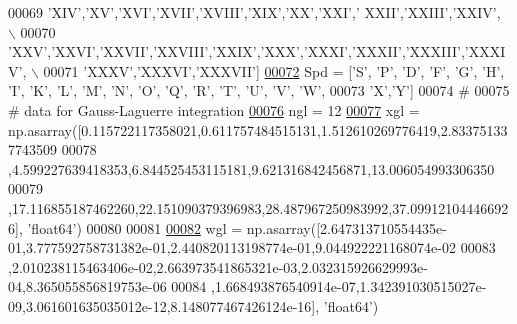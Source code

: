 \begin{DoxyCode}
00069     \textcolor{stringliteral}{'XIV'},\textcolor{stringliteral}{'XV'},\textcolor{stringliteral}{'XVI'},\textcolor{stringliteral}{'XVII'},\textcolor{stringliteral}{'XVIII'},\textcolor{stringliteral}{'XIX'},\textcolor{stringliteral}{'XX'},\textcolor{stringliteral}{'XXI'},\textcolor{stringliteral}{' XXII'},\textcolor{stringliteral}{'XXIII'},\textcolor{stringliteral}{'XXIV'}, \(\backslash\)
00070     \textcolor{stringliteral}{'XXV'},\textcolor{stringliteral}{'XXVI'},\textcolor{stringliteral}{'XXVII'},\textcolor{stringliteral}{'XXVIII'},\textcolor{stringliteral}{'XXIX'},\textcolor{stringliteral}{'XXX'},\textcolor{stringliteral}{'XXXI'},\textcolor{stringliteral}{'XXXII'},\textcolor{stringliteral}{'XXXIII'},\textcolor{stringliteral}{'XXXIV'}, \(\backslash\)
00071     \textcolor{stringliteral}{'XXXV'},\textcolor{stringliteral}{'XXXVI'},\textcolor{stringliteral}{'XXXVII'}]
\hypertarget{__chianti__constants_8py_source_l00072}{}\hyperlink{namespacepyneb_1_1utils_1_1__chianti__constants_a747bb75e4249625a2aefd7060478096f}{00072} Spd = [\textcolor{stringliteral}{'S'}, \textcolor{stringliteral}{'P'}, \textcolor{stringliteral}{'D'}, \textcolor{stringliteral}{'F'}, \textcolor{stringliteral}{'G'}, \textcolor{stringliteral}{'H'}, \textcolor{stringliteral}{'I'}, \textcolor{stringliteral}{'K'}, \textcolor{stringliteral}{'L'}, \textcolor{stringliteral}{'M'}, \textcolor{stringliteral}{'N'}, \textcolor{stringliteral}{'O'}, \textcolor{stringliteral}{'Q'}, \textcolor{stringliteral}{'}\textcolor{stringliteral}{R', '}T', '\textcolor{stringliteral}{U', '}V', 'W',
00073        \textcolor{stringliteral}{'X'},\textcolor{stringliteral}{'Y'}]
00074 \textcolor{comment}{#}
00075 \textcolor{comment}{#  data for Gauss-Laguerre integration}
\hypertarget{__chianti__constants_8py_source_l00076}{}\hyperlink{namespacepyneb_1_1utils_1_1__chianti__constants_aa56aafac98ada2bbf340753caef7378f}{00076} ngl =  12
\hypertarget{__chianti__constants_8py_source_l00077}{}\hyperlink{namespacepyneb_1_1utils_1_1__chianti__constants_af1590059269ec4a1186c9746d22d1201}{00077} xgl = np.asarray([0.115722117358021,0.611757484515131,1.512610269776419,2.833751337743509
00078     ,4.599227639418353,6.844525453115181,9.621316842456871,13.006054993306350
00079     ,17.116855187462260,22.151090379396983,28.487967250983992,37.099121044466926], \textcolor{stringliteral}{'float64'})
00080 
00081 
\hypertarget{__chianti__constants_8py_source_l00082}{}\hyperlink{namespacepyneb_1_1utils_1_1__chianti__constants_a46ae7f1b894a2436d928f1280232b724}{00082} wgl = np.asarray([2.647313710554435e-01,3.777592758731382e-01,2.440820113198774e-01,9.044922221168074e-02
00083     ,2.010238115463406e-02,2.663973541865321e-03,2.032315926629993e-04,8.365055856819753e-06
00084     ,1.668493876540914e-07,1.342391030515027e-09,3.061601635035012e-12,8.148077467426124e-16], \textcolor{stringliteral}{'float64'})
\end{DoxyCode}
